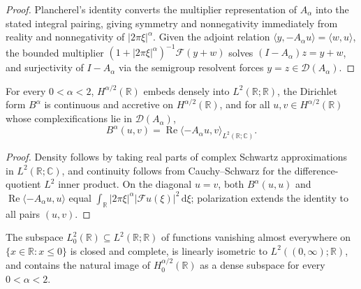 \begin{proof}
\leanok
Plancherel's identity converts the multiplier representation of $A_\alpha$ into the stated integral pairing, giving symmetry and nonnegativity immediately from reality and nonnegativity of $\lvert 2\pi\xi \rvert^\alpha$. Given the adjoint relation $\langle y, -A_\alpha u \rangle = \langle w, u \rangle$, the bounded multiplier $(1 + \lvert 2\pi\xi \rvert^\alpha)^{-1}\mathcal{F}(y+w)$ solves $(I - A_\alpha)z = y + w$, and surjectivity of $I - A_\alpha$ via the semigroup resolvent forces $y = z \in \mathcal{D}(A_\alpha)$.
\end{proof}

\begin{theorem}\label{thm:frac_form_friedrichs}
\leanok
For every $0 < \alpha < 2$, $H^{\alpha/2}(\mathbb{R})$ embeds densely into $L^2(\mathbb{R}; \mathbb{R})$, the Dirichlet form $B^\alpha$ is continuous and accretive on $H^{\alpha/2}(\mathbb{R})$, and for all $u, v \in H^{\alpha/2}(\mathbb{R})$ whose complexifications lie in $\mathcal{D}(A_\alpha)$,
\[
  B^\alpha(u, v) = \operatorname{Re}\langle -A_\alpha u, v \rangle_{L^2(\mathbb{R}; \mathbb{C})}.
\]
\end{theorem}

\begin{proof}
\leanok
Density follows by taking real parts of complex Schwartz approximations in $L^2(\mathbb{R}; \mathbb{C})$, and continuity follows from Cauchy--Schwarz for the difference-quotient $L^2$ inner product. On the diagonal $u = v$, both $B^\alpha(u, u)$ and $\operatorname{Re}\langle -A_\alpha u, u \rangle$ equal $\int_{\mathbb{R}} \lvert 2\pi\xi \rvert^\alpha \lvert \mathcal{F}u(\xi) \rvert^2\, \mathrm{d}\xi$; polarization extends the identity to all pairs $(u, v)$.
\end{proof}

\begin{theorem}\label{thm:zero_spaces}
\leanok
The subspace $L^2_0(\mathbb{R}) \subseteq L^2(\mathbb{R}; \mathbb{R})$ of functions vanishing almost everywhere on $\{x \in \mathbb{R} : x \le 0\}$ is closed and complete, is linearly isometric to $L^2((0, \infty); \mathbb{R})$, and contains the natural image of $H^{\alpha/2}_0(\mathbb{R})$ as a dense subspace for every $0 < \alpha < 2$.
\end{theorem}

